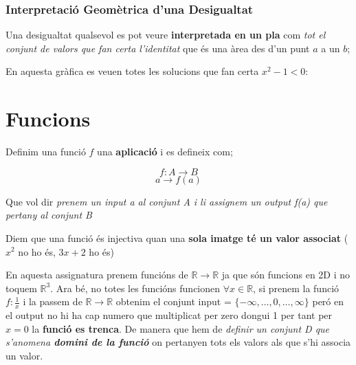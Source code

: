\documentclass[12pt]{article}
\newcommand{\R}{\mathbb{R}}
\begin{document}
\subsubsection{Interpretació Geomètrica d'una Desigualtat}

Una desigualtat qualsevol es pot veure \textbf{interpretada en un pla} com \textit{tot el conjunt de valors que fan certa l'identitat} que és una àrea des d'un punt $a$ a un $b$;

En aquesta gràfica es veuen totes les solucions que fan certa $x^2 - 1 < 0$:
\begin{center}
\end{center}

\section{Funcions}

Definim una funció $f$ una \textbf{aplicació} i es defineix com;

\[f: A \rightarrow B\]
\[a \rightarrow f(a)\]

Que vol dir \textit{prenem un input a al conjunt A i li assignem un output f(a) que pertany al conjunt B}

Diem que una funció és injectiva quan una \textbf{sola imatge té un valor associat} ($x^2$ no ho és, $3x+2$ ho és)

En aquesta assignatura prenem funcións de $\R \rightarrow \R$ ja que són funcions en 2D i no toquem $\R^3$. Ara bé, no totes les funcións funcionen $\forall x \in \R$, si prenem la funció $f: \frac{1}{x}$ i la passem de $\R \rightarrow \R$ obtenim el conjunt input = $\{-\infty, \dots, 0, \dots, \infty\}$ peró en el output no hi ha cap numero que multiplicat per zero dongui 1 per tant per $x = 0$ la \textbf{funció es trenca}. De manera que hem de \textit{definir un conjunt D que s'anomena \textbf{domini de la funció}} on pertanyen tots els valors als que s'hi associa un valor.
\end{document}
